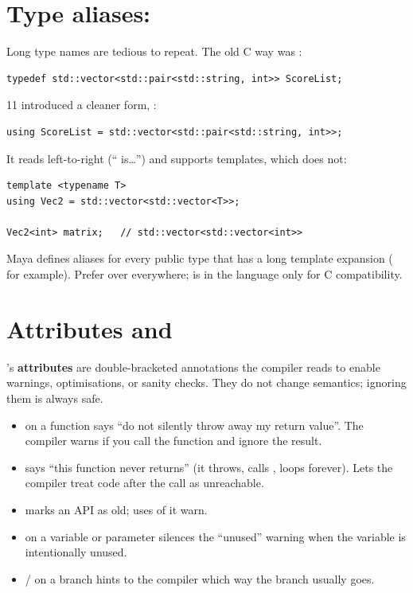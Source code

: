 \section{Type aliases: }
\label{sec:cpp:aliases}

Long type names are tedious to repeat. The old C way was
:

\begin{lstlisting}
typedef std::vector<std::pair<std::string, int>> ScoreList;
\end{lstlisting}

\cpp{}11 introduced a cleaner form, :

\begin{lstlisting}
using ScoreList = std::vector<std::pair<std::string, int>>;
\end{lstlisting}

It reads left-to-right (`` is\dots'') and supports
templates, which  does not:

\begin{lstlisting}
template <typename T>
using Vec2 = std::vector<std::vector<T>>;

Vec2<int> matrix;   // std::vector<std::vector<int>>
\end{lstlisting}

Maya defines aliases for every public type that has a long template
expansion ( for example). Prefer  over 
everywhere;  is in the language only for C
compatibility.

\section{Attributes and }
\label{sec:cpp:attributes}

\cpp{}'s \textbf{attributes} are double-bracketed annotations the
compiler reads to enable warnings, optimisations, or sanity checks.
They do not change semantics; ignoring them is always safe.

\begin{itemize}[leftmargin=*]
  \item \code{[[nodiscard]]} on a function says ``do not silently
    throw away my return value''. The compiler warns if you call
    the function and ignore the result.
  \item \code{[[noreturn]]} says ``this function never returns''
    (it throws, calls , loops forever). Lets the
    compiler treat code after the call as unreachable.
  \item {} marks an API as old; uses
    of it warn.
  \item {} on a variable or parameter
    silences the ``unused'' warning when the variable is
    intentionally unused.
  \item \code{[[likely]]} / \code{[[unlikely]]} on a branch hints
    to the compiler which way the branch usually goes.
\end{itemize}

